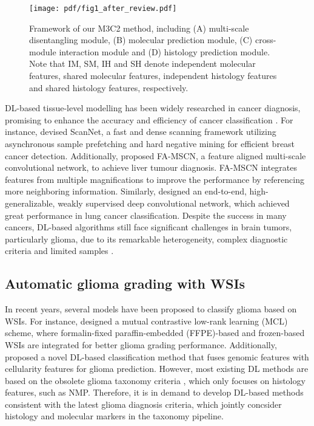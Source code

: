   \begin{figure*}[t]
    \centering
    \texttt{[image: pdf/fig1\_after\_review.pdf]}
    \caption{Framework of our M3C2 method, including (A) multi-scale disentangling module, (B) molecular prediction module, (C) cross-module interaction module and (D) histology prediction module. Note that IM, SM, IH and SH denote independent molecular features, shared molecular features, independent histology features and shared histology features, respectively.}
    \label{fig:framework}
\end{figure*}



DL-based tissue-level modelling has been widely researched in cancer diagnosis, promising to enhance the accuracy and efficiency of cancer classification \citep{yang2022pathologic,kanavati2020weakly}. For instance, \cite{lin2018scannet} devised ScanNet, a fast and dense scanning framework utilizing asynchronous sample prefetching and hard negative mining for efficient breast cancer detection. Additionally, \cite{yang2022pathologic} proposed FA-MSCN, a feature aligned multi-scale convolutional network, to achieve liver tumour diagnosis. FA-MSCN integrates features from multiple magnifications to improve the performance by referencing more neighboring information. Similarly, \cite{kanavati2020weakly} designed an end-to-end, high-generalizable, weakly supervised deep convolutional network, which achieved great performance in lung cancer classification. Despite the success in many cancers, DL-based algorithms still face significant challenges in brain tumors, particularly glioma, due to its remarkable heterogeneity, complex diagnostic criteria and limited samples \citep{perry2016histologic,louis20212021}.



\subsection{Automatic glioma grading with WSIs}


In recent years, several models \citep{zhang2022mutual,pei2021deep,lv2024insight} have been proposed to classify glioma based on WSIs. For instance, \cite{zhang2022mutual} designed a mutual contrastive low-rank learning (MCL) scheme, where formalin-fixed paraffin-embedded (FFPE)-based  and frozen-based WSIs are integrated for better glioma grading performance. Additionally, \cite{pei2021deep} proposed a novel DL-based classification method that fuses genomic features with cellularity features for glioma prediction. However, most existing DL methods are based on the obsolete glioma taxonomy criteria \citep{louis20072007,louis20162016}, which only focuses on histology features, such as NMP. Therefore, it is in demand to develop DL-based methods consistent with the latest glioma diagnosis criteria, which jointly concsider histology and molecular markers in the taxonomy pipeline.



